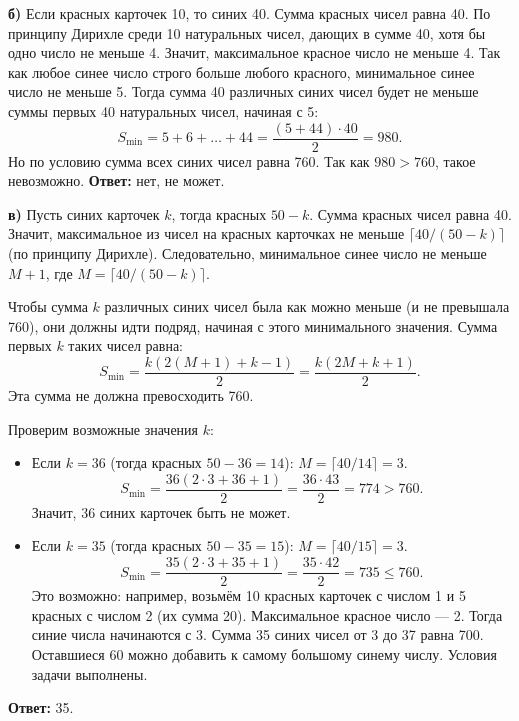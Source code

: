 \documentclass[12pt, a4paper]{article}
\begin{document}
\textbf{б)} Если красных карточек 10, то синих 40. 
Сумма красных чисел равна 40. По принципу Дирихле среди 10 натуральных чисел, дающих в сумме 40, хотя бы одно число не меньше 4. Значит, максимальное красное число не меньше 4.
Так как любое синее число строго больше любого красного, минимальное синее число не меньше 5.
Тогда сумма 40 различных синих чисел будет не меньше суммы первых 40 натуральных чисел, начиная с 5:
\[
S_{\min} = 5 + 6 + \ldots + 44 = \frac{(5 + 44) \cdot 40}{2} = 980.
\]
Но по условию сумма всех синих чисел равна 760. Так как $980 > 760$, такое невозможно.
\textbf{Ответ:} нет, не может.

\textbf{в)} Пусть синих карточек $k$, тогда красных $50-k$. 
Сумма красных чисел равна 40. Значит, максимальное из чисел на красных карточках не меньше $\lceil 40/(50-k) \rceil$ (по принципу Дирихле). Следовательно, минимальное синее число не меньше $M + 1$, где $M = \lceil 40/(50-k) \rceil$.

Чтобы сумма $k$ различных синих чисел была как можно меньше (и не превышала 760), они должны идти подряд, начиная с этого минимального значения. Сумма первых $k$ таких чисел равна:
\[
S_{\min} = \frac{k(2(M+1) + k - 1)}{2} = \frac{k(2M + k + 1)}{2}.
\]
Эта сумма не должна превосходить 760.

Проверим возможные значения $k$:
\begin{itemize}
    \item Если $k = 36$ (тогда красных $50-36=14$): $M = \lceil 40/14 \rceil = 3$. 
    \[
    S_{\min} = \frac{36(2 \cdot 3 + 36 + 1)}{2} = \frac{36 \cdot 43}{2} = 774 > 760.
    \]
    Значит, 36 синих карточек быть не может.
    
    \item Если $k = 35$ (тогда красных $50-35=15$): $M = \lceil 40/15 \rceil = 3$. 
    \[
    S_{\min} = \frac{35(2 \cdot 3 + 35 + 1)}{2} = \frac{35 \cdot 42}{2} = 735 \le 760.
    \]
    Это возможно: например, возьмём 10 красных карточек с числом 1 и 5 красных с числом 2 (их сумма 20). Максимальное красное число — 2. Тогда синие числа начинаются с 3. Сумма 35 синих чисел от 3 до 37 равна 700. Оставшиеся 60 можно добавить к самому большому синему числу. Условия задачи выполнены.
\end{itemize}

\textbf{Ответ:} 35.
\end{document}
